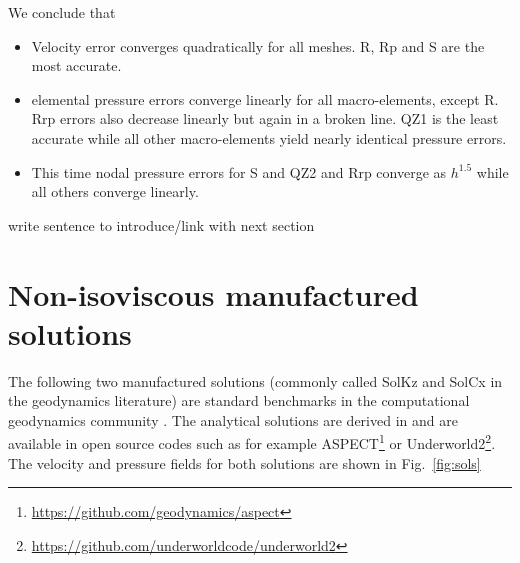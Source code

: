 \documentclass[a4paper,12pt]{article}
\begin{document}
We conclude that 
\begin{itemize}
\item Velocity error converges quadratically for all meshes. R, Rp and S are the most accurate.
\item elemental pressure errors converge linearly for all macro-elements, except R.
Rrp errors also decrease linearly but again in a broken line. 
QZ1 is the least accurate while all other macro-elements
yield nearly identical pressure errors.
\item This time nodal pressure errors for S and QZ2 and Rrp converge as $h^{1.5}$
while all others converge linearly.
\end{itemize}


{\color{red} write sentence to introduce/link with next section}


\section{Non-isoviscous manufactured solutions}

The following two manufactured solutions (commonly called SolKz and SolCx in the 
geodynamics literature) are standard benchmarks in the computational geodynamics 
community \cite{mozg96,mamo08,krhb12,gemd13,demh19,thba22}.
The analytical solutions are derived in \cite{zhon96} and are available in open source codes
such as for example ASPECT\footnote{\url{https://github.com/geodynamics/aspect}} or 
Underworld2\footnote{\url{https://github.com/underworldcode/underworld2}}.
The velocity and pressure fields for both solutions are shown in Fig.~\ref{fig:sols}
\end{document}
